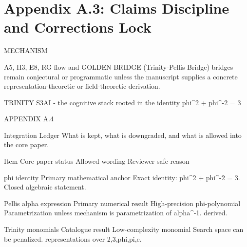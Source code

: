
\section{Appendix A.3: Claims Discipline and Corrections Lock}

MECHANISM

  A5, H3, E8, RG flow and GOLDEN BRIDGE (Trinity-Pellis Bridge) bridges remain conjectural or programmatic unless the manuscript
  supplies a concrete representation-theoretic or field-theoretic derivation.

                           TRINITY S3AI - the cognitive stack rooted in the identity phi\textasciicircum{}2 + phi\textasciicircum{}-2 = 3

                                                          APPENDIX A.4

                                     Integration Ledger
                What is kept, what is downgraded, and what is allowed into the core paper.

          Item                  Core-paper status                      Allowed wording                        Reviewer-safe reason

 phi identity              Primary mathematical anchor      Exact identity: phi\textasciicircum{}2 + phi\textasciicircum{}-2 = 3.       Closed algebraic statement.

 Pellis alpha expression   Primary numerical result         High-precision phi-polynomial             Parametrization unless mechanism is
                                                            parametrization of alpha\textasciicircum{}-1.              derived.

 Trinity monomials         Catalogue result                 Low-complexity monomial                   Search space can be penalized.
                                                            representations over {2,3,phi,pi,e}.